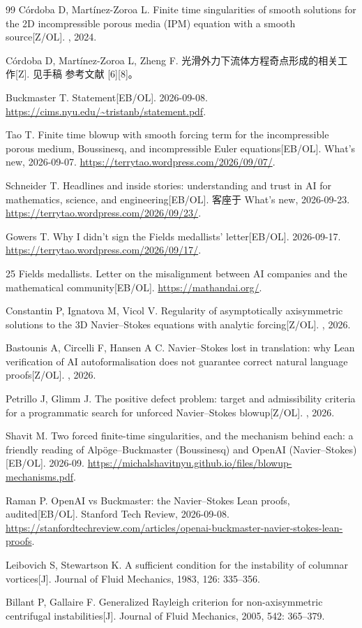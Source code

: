 \begin{thebibliography}{99}
 C\'ordoba D, Mart\'inez-Zoroa L. Finite time singularities of smooth solutions for the 2D incompressible porous media (IPM) equation with a smooth source[Z/OL]. , 2024.

 C\'ordoba D, Mart\'inez-Zoroa L, Zheng F. 光滑外力下流体方程奇点形成的相关工作[Z]. 见手稿\cite{openai-paper} 参考文献 [6][8]。

 Buckmaster T. Statement[EB/OL]. 2026-09-08. \url{https://cims.nyu.edu/~tristanb/statement.pdf}.

 Tao T. Finite time blowup with smooth forcing term for the incompressible porous medium, Boussinesq, and incompressible Euler equations[EB/OL]. What's new, 2026-09-07. \url{https://terrytao.wordpress.com/2026/09/07/}.

 Schneider T. Headlines and inside stories: understanding and trust in AI for mathematics, science, and engineering[EB/OL]. 客座于 What's new, 2026-09-23. \url{https://terrytao.wordpress.com/2026/09/23/}.

 Gowers T. Why I didn't sign the Fields medallists' letter[EB/OL]. 2026-09-17. \url{https://terrytao.wordpress.com/2026/09/17/}.

 25 Fields medallists. Letter on the misalignment between AI companies and the mathematical community[EB/OL]. \url{https://mathandai.org/}.

 Constantin P, Ignatova M, Vicol V. Regularity of asymptotically axisymmetric solutions to the 3D Navier--Stokes equations with analytic forcing[Z/OL]. , 2026.

 Bastounis A, Circelli F, Hansen A C. Navier--Stokes lost in translation: why Lean verification of AI autoformalisation does not guarantee correct natural language proofs[Z/OL]. , 2026.

 Petrillo J, Glimm J. The positive defect problem: target and admissibility criteria for a programmatic search for unforced Navier--Stokes blowup[Z/OL]. , 2026.

 Shavit M. Two forced finite-time singularities, and the mechanism behind each: a friendly reading of Alp\"oge--Buckmaster (Boussinesq) and OpenAI (Navier--Stokes)[EB/OL]. 2026-09. \url{https://michalshavitnyu.github.io/files/blowup-mechanisms.pdf}.

 Raman P. OpenAI vs Buckmaster: the Navier--Stokes Lean proofs, audited[EB/OL]. Stanford Tech Review, 2026-09-08. \url{https://stanfordtechreview.com/articles/openai-buckmaster-navier-stokes-lean-proofs}.

 Leibovich S, Stewartson K. A sufficient condition for the instability of columnar vortices[J]. Journal of Fluid Mechanics, 1983, 126: 335--356.

 Billant P, Gallaire F. Generalized Rayleigh criterion for non-axisymmetric centrifugal instabilities[J]. Journal of Fluid Mechanics, 2005, 542: 365--379.

\end{thebibliography}